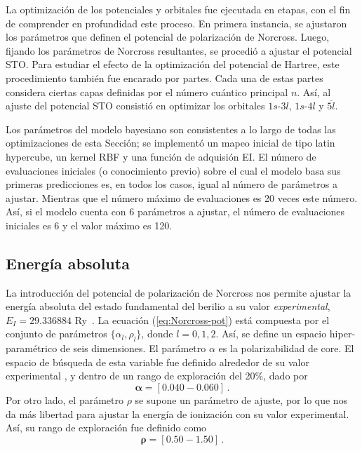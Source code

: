 La optimización de los potenciales y orbitales fue ejecutada en etapas, 
con el fin de comprender en profundidad este proceso. En primera 
instancia, se ajustaron los parámetros que definen el potencial de 
polarización de Norcross. Luego, fijando los parámetros de Norcross 
resultantes, se procedió a ajustar el potencial STO. Para estudiar el 
efecto de la optimización del potencial de Hartree, este procedimiento 
también fue encarado por partes. Cada una de estas partes considera 
ciertas capas definidas por el número cuántico principal $n$. Así, al 
ajuste del potencial STO consistió en optimizar los orbitales $1s$-$3l$, 
$1s$-$4l$ y $\overline{5l}$.

Los parámetros del modelo bayesiano son consistentes a lo largo de todas 
las optimizaciones de esta Sección; se implementó un mapeo inicial de 
tipo latin hypercube, un kernel RBF y una función de adquisión EI. El 
número de evaluaciones iniciales (o conocimiento previo) sobre el cual el 
modelo basa sus primeras predicciones es, en todos los casos, igual al 
número de parámetros a ajustar. Mientras que el número máximo de 
evaluaciones es 20 veces este número.  Así, si el modelo cuenta con 6 
parámetros a ajustar, el número de evaluaciones iniciales es 6 y el valor
máximo es 120.

\subsection{Energía absoluta}

La introducción del potencial de polarización de Norcross nos permite
ajustar la energía absoluta del estado fundamental del berilio a su valor 
\textit{experimental}, $E_I=29.336884$ Ry~\cite{NIST}. La ecuación 
(\ref{eq:Norcross-pot}) está compuesta por el conjunto de parámetros 
$\{\alpha_l,\rho_l\}$, donde $l=0,1,2$. Así, se define un espacio 
hiper-paramétrico de seis dimensiones. El parámetro $\alpha$ es la 
polarizabilidad de core. El espacio de búsqueda de esta variable fue 
definido alrededor de su valor experimental \cite{Dalgarno:62,Sitz:71},
y dentro de un rango de exploración del 20\%, dado por
\begin{equation}
\boldsymbol\alpha=[0.040-0.060]\,.
\end{equation}
Por otro lado, el parámetro $\rho$ se supone un parámetro de ajuste, por 
lo que nos da más libertad para ajustar la energía de ionización con su 
valor experimental. Así, su rango de exploración fue definido como
\begin{equation}
\boldsymbol\rho=[0.50-1.50]\,.
\end{equation}

